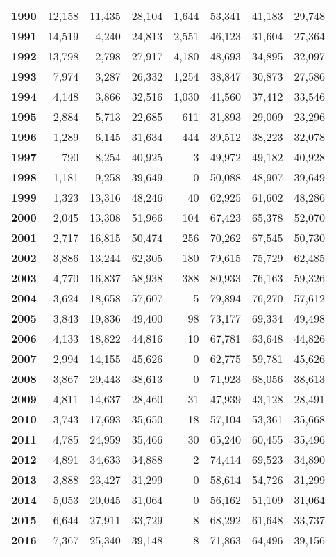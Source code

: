 \begin{table}[h]
{\begin{tabular}{@{}>{\bfseries}r r r c r r c c@{}}
1990 & 12,158 & 11,435 & 28,104 & 1,644 & 53,341 & 41,183 & 29,748 \\
1991 & 14,519 & 4,240 & 24,813 & 2,551 & 46,123 & 31,604 & 27,364 \\
1992 & 13,798 & 2,798 & 27,917 & 4,180 & 48,693 & 34,895 & 32,097 \\
1993 & 7,974 & 3,287 & 26,332 & 1,254 & 38,847 & 30,873 & 27,586 \\
1994 & 4,148 & 3,866 & 32,516 & 1,030 & 41,560 & 37,412 & 33,546 \\
1995 & 2,884 & 5,713 & 22,685 & 611 & 31,893 & 29,009 & 23,296 \\
1996 & 1,289 & 6,145 & 31,634 & 444 & 39,512 & 38,223 & 32,078 \\
1997 & 790 & 8,254 & 40,925 & 3 & 49,972 & 49,182 & 40,928 \\
1998 & 1,181 & 9,258 & 39,649 & 0 & 50,088 & 48,907 & 39,649 \\
1999 & 1,323 & 13,316 & 48,246 & 40 & 62,925 & 61,602 & 48,286 \\
2000 & 2,045 & 13,308 & 51,966 & 104 & 67,423 & 65,378 & 52,070 \\
2001 & 2,717 & 16,815 & 50,474 & 256 & 70,262 & 67,545 & 50,730 \\
2002 & 3,886 & 13,244 & 62,305 & 180 & 79,615 & 75,729 & 62,485 \\
2003 & 4,770 & 16,837 & 58,938 & 388 & 80,933 & 76,163 & 59,326 \\
2004 & 3,624 & 18,658 & 57,607 & 5 & 79,894 & 76,270 & 57,612 \\
2005 & 3,843 & 19,836 & 49,400 & 98 & 73,177 & 69,334 & 49,498 \\
2006 & 4,133 & 18,822 & 44,816 & 10 & 67,781 & 63,648 & 44,826 \\
2007 & 2,994 & 14,155 & 45,626 & 0 & 62,775 & 59,781 & 45,626 \\
2008 & 3,867 & 29,443 & 38,613 & 0 & 71,923 & 68,056 & 38,613 \\
2009 & 4,811 & 14,637 & 28,460 & 31 & 47,939 & 43,128 & 28,491 \\
2010 & 3,743 & 17,693 & 35,650 & 18 & 57,104 & 53,361 & 35,668 \\
2011 & 4,785 & 24,959 & 35,466 & 30 & 65,240 & 60,455 & 35,496 \\
2012 & 4,891 & 34,633 & 34,888 & 2 & 74,414 & 69,523 & 34,890 \\
2013 & 3,888 & 23,427 & 31,299 & 0 & 58,614 & 54,726 & 31,299 \\
2014 & 5,053 & 20,045 & 31,064 & 0 & 56,162 & 51,109 & 31,064 \\
2015 & 6,644 & 27,911 & 33,729 & 8 & 68,292 & 61,648 & 33,737 \\
2016 & 7,367 & 25,340 & 39,148 & 8 & 71,863 & 64,496 & 39,156 \\
\bottomrule
\end{tabular}
}
\end{table}
